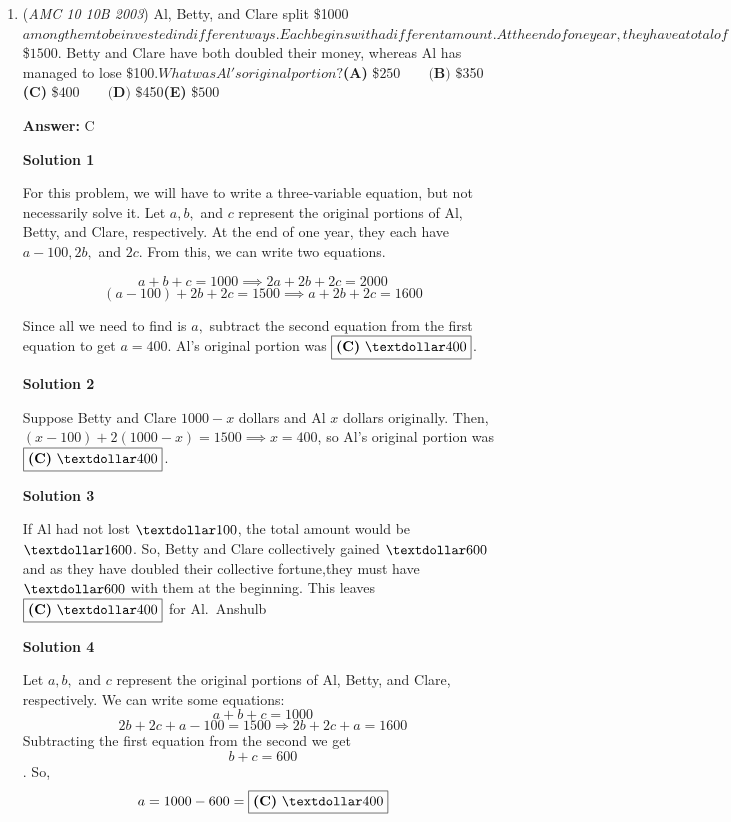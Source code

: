 \begin{enumerate}
	\item (\textit{AMC 10 10B 2003}) Al, Betty, and Clare split $\$$1000$ among them to be invested in different ways. Each begins with a different amount. At the end of one year, they have a total of $\$$1500$. Betty and Clare have both doubled their money, whereas Al has managed to lose $\$$100$. What was Al's original portion?


 $\textbf{(A) }\$$250 \qquad\textbf{(B) }\$ $350 \qquad\textbf{(C) }\$$400\qquad\textbf{(D) }\$ $450\qquad\textbf{(E) }\$$500$

 \textbf{Answer: }C



\textbf{Solution 1}

For this problem, we will have to write a three-variable equation, but not necessarily solve it. Let $a, b,$ and $c$ represent the original portions of Al, Betty, and Clare, respectively. At the end of one year, they each have $a-100, 2b,$ and $2c$. From this, we can write two equations. 

 
 \[a+b+c=1000 \implies 2a+2b+2c=2000\]
 \[(a-100)+2b+2c=1500 \implies a+2b+2c=1600\]

 Since all we need to find is $a,$ subtract the second equation from the first equation to get $a=400.$ Al's original portion was $\boxed{\textbf{(C)}\ \textdollar 400}$.

 



\textbf{Solution 2}

Suppose Betty and Clare $1000-x$ dollars and Al $x$ dollars originally. Then, $(x-100)+2(1000-x)=1500 \implies x=400$, so Al's original portion was $\boxed{\textbf{(C)}\ \textdollar 400}$.

 



\textbf{Solution 3}

If Al had not lost $\textdollar 100$, the total amount would be $\textdollar 1600$. So, Betty and Clare collectively gained $\textdollar 600$ and as they have doubled their collective fortune,they must have $\textdollar 600$ with them at the beginning. This leaves $\boxed{\textbf{(C)}\ \textdollar 400}$ for Al.~Anshulb

 



\textbf{Solution 4}

Let $a, b,$ and $c$ represent the original portions of Al, Betty, and Clare, respectively. We can write some equations:
 \[a+b+c = 1000\]
 \[2b+2c+a-100 = 1500 \Longrightarrow 2b+2c+a=1600\]Subtracting the first equation from the second we get 
 \[b+c = 600\]. So, 
 \[a = 1000-600 = \boxed{\textbf{(C)}\ \textdollar 400}\]


\end{enumerate}
